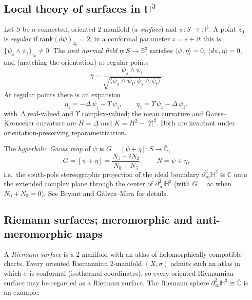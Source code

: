 \documentclass[11pt,a4paper]{article}
\newcommand{\Cbar}{\overline{\mathbb{C}}}           %
\newcommand{\Hyp}{\mathbb{H}^3}                      %
\newcommand{\deS}{\mathbb{S}^3_1}                    %
\newcommand{\ip}[2]{\langle #1,#2\rangle}            %
\theoremstyle{plain}
\theoremstyle{definition}
\theoremstyle{remark}
\begin{document}
\subsection{Local theory of surfaces in $\Hyp$}\label{ssec:local}

Let $S$ be a connected, oriented $2$-manifold (a \emph{surface}) and
$\psi:S\to\Hyp$. A point $z_0$ is \emph{regular} if $\mathrm{rank}(d\psi)_{z_0}=2$;
in a conformal parameter $z=s+it$ this is $\{\psi_s\wedge\psi_t\}_{z_0}\ne0$.
The \emph{unit normal field} $\eta:S\to\deS$ satisfies $\ip\psi\eta=0$,
$\ip{d\psi}\eta=0$, and (matching the orientation) at regular points
\begin{equation}
  \eta = \frac{\psi_s\wedge\psi_t}{\sqrt{\ip{\psi_s\wedge\psi_t}{\psi_s\wedge\psi_t}}}.
\end{equation}
At regular points there is an expansion
\begin{equation}\label{eq:eta-expansion}
  \eta_z = -\Delta\,\psi_z+\Upsilon\,\psi_{\bar z}, \qquad
  \eta_{\bar z} = \bar\Upsilon\,\psi_z-\Delta\,\psi_{\bar z},
\end{equation}
with $\Delta$ real-valued and $\Upsilon$ complex-valued; the mean
curvature and Gauss--Kronecker curvature are $H=\Delta$ and
$K=H^2-|\Upsilon|^2$. Both are invariant under orientation-preserving
reparametrization.

The \emph{hyperbolic Gauss map} of $\psi$ is $G=[\psi+\eta]:S\to\Cbar$,
\begin{equation}\label{eq:Gdef}
  G = [\psi+\eta] = \frac{N_1-iN_2}{N_0+N_3}, \qquad N=\psi+\eta,
\end{equation}
i.e.\ the south-pole stereographic projection of the ideal boundary
$\partial^2_\infty\Hyp\cong\Cbar$ onto the extended complex plane through the
center of $\partial^2_\infty\Hyp$ (with $G=\infty$ when $N_0+N_3=0$). See
Bryant \cite{BRYANT} and Gálvez--Mira \cite{GMM2,GMM1} for details.

\subsection{Riemann surfaces; meromorphic and anti-meromorphic maps}

A \emph{Riemann surface} is a $2$-manifold with an atlas of holomorphically
compatible charts. Every oriented Riemannian $2$-manifold $(X,\sigma)$
admits such an atlas in which $\sigma$ is conformal (isothermal
coordinates), so every oriented Riemannian surface may be regarded as a
Riemann surface. The Riemann sphere $\partial^2_\infty\Hyp\cong\Cbar$ is
an example.
\end{document}
